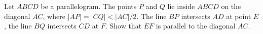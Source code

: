 Let $ABCD$ be a parallelogram. The points $P$ and $Q$ lie inside $ABCD$ on the diagonal $AC$,
where $|AP|=|CQ|<|AC|/2$. The line $BP$ intersects $AD$ at point $E$,
the line $BQ$ intersects $CD$ at $F$. Show that $EF$ is parallel to the diagonal $AC$.